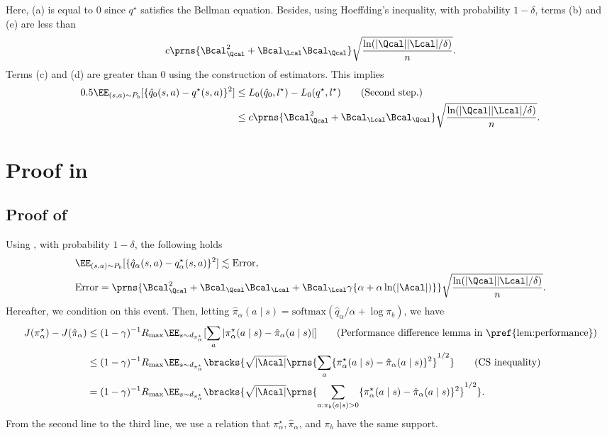 Here, (a) is equal to $0$ since $q^{\star}$ satisfies the Bellman equation. Besides, using Hoeffding's inequality, with probability $1-\delta$, terms (b) and (e) are less than $$c \prns{  \Bcal^2_{\Qcal}+ \Bcal_{\Lcal}\Bcal_{\Qcal}} \sqrt{\frac{\ln(|\Qcal||\Lcal|/\delta)}{n}}.$$ Terms (c) and (d) are greater than $0$ using the construction of estimators. 
This implies 
\begin{align*}
0.5\EE_{(s,a) \sim P_b}[\{\hat q_0(s,a)-q^{\star}(s,a) \}^2]
&\leq L_0(\hat q_0,l^{\star})- L_0(q^{\star},l^{\star}) \tag{Second step.}\\
&\leq c\prns{  \Bcal^2_{\Qcal}+  \Bcal_{\Lcal}\Bcal_{\Qcal}}\sqrt{\frac{\ln(|\Qcal||\Lcal|/\delta)}{n}}. 
\end{align*}

\section{Proof in }\label{sec:detail_proof}



\subsection{Proof of }

Using , with probability $1-\delta$, the following holds 
\begin{align}\label{eq:l2_error_softmax}
    &\EE_{(s,a) \sim P_b}[\{\hat q_{\alpha}(s,a)-q^{\star}_{\alpha}(s,a)\}^2 ] \lesssim \mathrm{Error},  \\
     & \mathrm{Error} =\prns{  \Bcal^2_{\Qcal}+ \Bcal_{\Qcal}\Bcal_{\Lcal}+ \Bcal_{\Lcal}\gamma \{\alpha+\alpha  \ln(|\Acal|)\}} \sqrt{\frac{\ln(|\Qcal||\Lcal|/\delta)}{n}}.  \nonumber
\end{align}
Hereafter, we condition on this event. Then, letting $\hat \pi_{\alpha}(a\mid s)=\mathrm{softmax}(\hat q_{\alpha}/\alpha + \log \pi_b)$, we have  
\begin{align*}
    J(\pi^{\star}_{\alpha})-J(\hat \pi_{\alpha})&\leq (1-\gamma)^{-1}R_{\max} \EE_{s \sim d_{\pi^{\star}_{\alpha}}}[\sum_{a} |\pi^{\star}_{\alpha}(a\mid s)-\hat \pi_{\alpha}(a \mid s)| ] \tag{Performance difference lemma in \pref{lem:performance}} \\
     &\leq (1-\gamma)^{-1}R_{\max}\EE_{s \sim d_{\pi^{\star}_{\alpha}}}\bracks{\sqrt{|\Acal|}\prns{\sum_{a}\{\pi^{\star}_{\alpha}(a\mid s)-\hat \pi_{\alpha}(a\mid s)\}^2}^{1/2}} \tag{CS inequality} \\ 
    &= (1-\gamma)^{-1}R_{\max}\EE_{s \sim d_{\pi^{\star}_{\alpha}}}\bracks{\sqrt{|\Acal|}\prns{\sum_{a: \pi_b(a \mid s)>0}\{\pi^{\star}_{\alpha}(a\mid s)-\hat \pi_{\alpha}(a\mid s)\}^2}^{1/2}}.
\end{align*}
From the second line to the third line, we use a relation that $\pi^{\star}_{\alpha},\hat \pi_{\alpha}$, and $\pi_b$ have the same support. 

